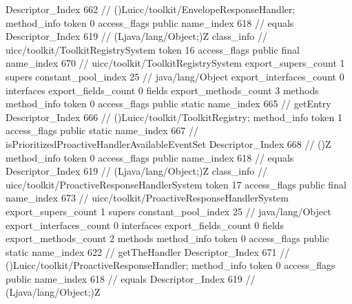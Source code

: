 {{{{{					Descriptor_Index	662		// ()Luicc/toolkit/EnvelopeResponseHandler;
				}
				method_info {
					token	0
					access_flags	public
					name_index	618		// equals
					Descriptor_Index	619		// (Ljava/lang/Object;)Z
				}
			}
		}
		class_info {		// uicc/toolkit/ToolkitRegistrySystem
			token	16
			access_flags	public final
			name_index	670		// uicc/toolkit/ToolkitRegistrySystem
			export_supers_count	1
			supers {
				constant_pool_index	25		// java/lang/Object
			}
			export_interfaces_count	0
			interfaces {
			}
			export_fields_count	0
			fields {
			}
			export_methods_count	3
			methods {
				method_info {
					token	0
					access_flags	public static
					name_index	665		// getEntry
					Descriptor_Index	666		// ()Luicc/toolkit/ToolkitRegistry;
				}
				method_info {
					token	1
					access_flags	public static
					name_index	667		// isPrioritizedProactiveHandlerAvailableEventSet
					Descriptor_Index	668		// ()Z
				}
				method_info {
					token	0
					access_flags	public
					name_index	618		// equals
					Descriptor_Index	619		// (Ljava/lang/Object;)Z
				}
			}
		}
		class_info {		// uicc/toolkit/ProactiveResponseHandlerSystem
			token	17
			access_flags	public final
			name_index	673		// uicc/toolkit/ProactiveResponseHandlerSystem
			export_supers_count	1
			supers {
				constant_pool_index	25		// java/lang/Object
			}
			export_interfaces_count	0
			interfaces {
			}
			export_fields_count	0
			fields {
			}
			export_methods_count	2
			methods {
				method_info {
					token	0
					access_flags	public static
					name_index	622		// getTheHandler
					Descriptor_Index	671		// ()Luicc/toolkit/ProactiveResponseHandler;
				}
				method_info {
					token	0
					access_flags	public
					name_index	618		// equals
					Descriptor_Index	619		// (Ljava/lang/Object;)Z
				}
			}
		}
	}
}
